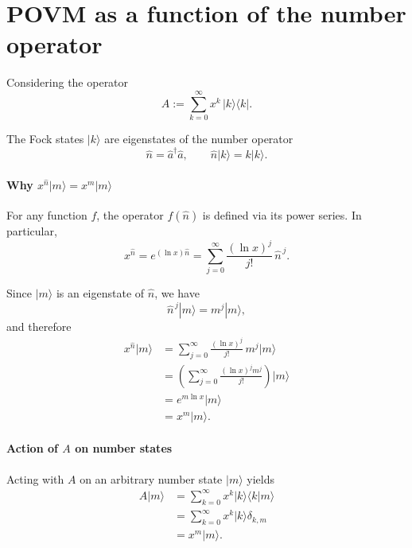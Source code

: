 \documentclass[%
 reprint,
 amsmath,amssymb,
 aps,
twocolumn
]{revtex4-2}
\begin{document}
\section{POVM as a function of the number operator}
Considering the operator
\begin{equation}
A := \sum_{k=0}^{\infty} x^k \, |k\rangle\langle k|.
\end{equation}

The Fock states $|k\rangle$ are eigenstates of the number operator
\begin{equation}
\hat{n} = \hat{a}^\dagger \hat{a}, 
\qquad 
\hat{n} |k\rangle = k |k\rangle.
\end{equation}

\paragraph{Why $x^{\hat{n}}|m\rangle = x^m |m\rangle$}

For any function $f$, the operator $f(\hat{n})$ is defined via its power series. 
In particular,
\begin{equation}
x^{\hat{n}} = e^{(\ln x)\hat{n}}
= \sum_{j=0}^{\infty} \frac{(\ln x)^j}{j!} \, \hat{n}^{\,j}.
\end{equation}

Since $|m\rangle$ is an eigenstate of $\hat{n}$, we have
\begin{equation}
\hat{n}^{\,j} |m\rangle = m^j |m\rangle,
\end{equation}
and therefore
\begin{align}
x^{\hat{n}} |m\rangle
&= \sum_{j=0}^{\infty} \frac{(\ln x)^j}{j!} \, m^j |m\rangle \\
&= \left( \sum_{j=0}^{\infty} \frac{(\ln x)^j m^j}{j!} \right) |m\rangle \\
&= e^{m \ln x} |m\rangle \\
&= x^m |m\rangle.
\end{align}

\paragraph{Action of $A$ on number states}

Acting with $A$ on an arbitrary number state $|m\rangle$ yields
\begin{align}
A|m\rangle
&= \sum_{k=0}^{\infty} x^k |k\rangle \langle k|m\rangle \\
&= \sum_{k=0}^{\infty} x^k |k\rangle \delta_{k,m} \\
&= x^m |m\rangle.
\end{align}
\end{document}
